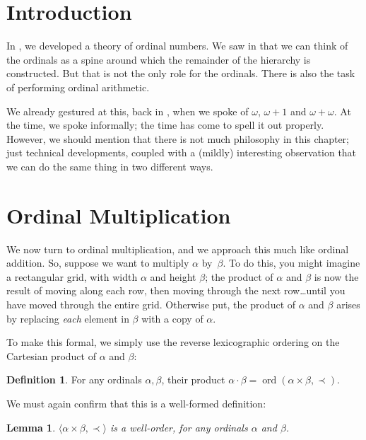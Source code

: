 \documentclass[10pt,a4paper]{article}
\makeatletter
\theoremstyle{plain}
\newtheorem{lem}[thm]{Lemma}
\theoremstyle{definition}
\newtheorem{defn}[thm]{Definition}
\theoremstyle{remark}
\newcommand*{\olfileid}[3]{}
\newcommand*{\olsection}[1]{\section*{#1}}
\newcommand*{\ollabel}[1]{\label{#1}}
\newcommand{\olref}{\@ifnextchar[{\olref@i}{\olref@final}}
\def\olref@i[#1]{\@ifnextchar[{\olref@ii}{\olref@final}}
\def\olref@ii[#1]{\@ifnextchar[{\olref@iii}{\olref@final}}
\def\olref@iii[#1]{\olref@final}
\def\olref@final#1{\ref{#1}}
\providecommand{\tuple}[1]{\langle #1 \rangle}
\providecommand{\ordtimes}{\mathbin{\cdot}}
\providecommand{\ordtype}[1]{\operatorname{ord}(#1)}
\providecommand{\rlexless}{\prec}
\makeatother
\begin{document}

\olfileid{sth}{ord-arithmetic}{intro}

\olsection{Introduction}

In \olref[ordinals][]{chap}, we developed a theory of ordinal numbers.
We saw in \olref[spine][]{chap} that we can think of the ordinals as a
spine around which the remainder of the hierarchy is constructed. But
that is not the only role for the ordinals. There is also the task of
performing ordinal arithmetic. 

We already gestured at this, back in
\olref[ordinals][idea]{sec}, when we spoke of $\omega$,
$\omega+1$ and $\omega+\omega$. At the time, we spoke informally; the
time has come to spell it out properly. However, we should mention
that there is not much philosophy in this chapter; just technical
developments, coupled with a (mildly) interesting observation that we
can do the same thing in two different ways.



\olfileid{sth}{ord-arithmetic}{mult}

\olsection{Ordinal Multiplication}

We now turn to ordinal multiplication, and we approach this much like
ordinal addition. So, suppose we want to multiply $\alpha$ by~$\beta$.
To do this, you might imagine a rectangular grid, with width $\alpha$
and height $\beta$; the product of $\alpha$ and $\beta$ is now the
result of moving along each row, then moving through the next
row\ldots until you have moved through the entire grid. Otherwise put,
the product of $\alpha$ and $\beta$ arises by replacing \emph{each}
element in $\beta$ with a copy of $\alpha$.  

To make this formal, we simply use the reverse lexicographic ordering
on the Cartesian product of $\alpha$ and $\beta$:

\begin{defn}
For any ordinals $\alpha, \beta$, their product $\alpha \ordtimes \beta = \ordtype{\alpha \times \beta, \rlexless}$.
\end{defn}
\noindent
We must again confirm that this is a well-formed definition:

\begin{lem}\ollabel{ordtimeslessiswo}
$\tuple{\alpha \times \beta, \rlexless}$ is a well-order, for any
ordinals $\alpha$ and $\beta$.
\end{lem}
\end{document}

